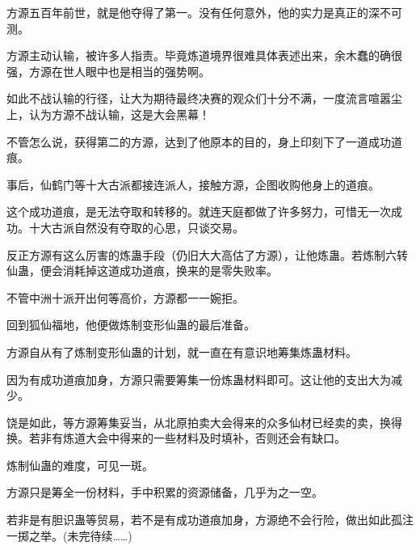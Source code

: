 \begin{this_body}
方源五百年前世，就是他夺得了第一。没有任何意外，他的实力是真正的深不可测。

方源主动认输，被许多人指责。毕竟炼道境界很难具体表述出来，余木蠢的确很强，方源在世人眼中也是相当的强势啊。

如此不战认输的行径，让大为期待最终决赛的观众们十分不满，一度流言喧嚣尘上，认为方源不战认输，这是大会黑幕！

不管怎么说，获得第二的方源，达到了他原本的目的，身上印刻下了一道成功道痕。

事后，仙鹤门等十大古派都接连派人，接触方源，企图收购他身上的道痕。

这个成功道痕，是无法夺取和转移的。就连天庭都做了许多努力，可惜无一次成功。十大古派自然没有夺取的心思，只谈交易。

反正方源有这么厉害的炼蛊手段（仍旧大大高估了方源），让他炼蛊。若炼制六转仙蛊，便会消耗掉这道成功道痕，换来的是零失败率。

不管中洲十派开出何等高价，方源都一一婉拒。

回到狐仙福地，他便做炼制变形仙蛊的最后准备。

方源自从有了炼制变形仙蛊的计划，就一直在有意识地筹集炼蛊材料。

因为有成功道痕加身，方源只需要筹集一份炼蛊材料即可。这让他的支出大为减少。

饶是如此，等方源筹集妥当，从北原拍卖大会得来的众多仙材已经卖的卖，换得换。若非有炼道大会中得来的一些材料及时填补，否则还会有缺口。

炼制仙蛊的难度，可见一斑。

方源只是筹全一份材料，手中积累的资源储备，几乎为之一空。

若非是有胆识蛊等贸易，若不是有成功道痕加身，方源绝不会行险，做出如此孤注一掷之举。(未完待续……)

\end{this_body}


